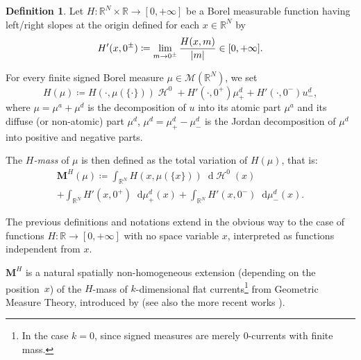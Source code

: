 \documentclass[10pt]{amsart}
\theoremstyle{plain}
\theoremstyle{definition}
\newtheorem{definition}[theorem]{Definition}
\newcommand{\dd}{\mathop{}\mathopen{}\mathrm{d}}
\newcommand{\R}{\mathbb{R}}
\newcommand{\Mspace}{\mathscr{M}}
\newcommand{\mass}{\boldsymbol{M}}
\DeclarePairedDelimiter{\abs}{\lvert}{\rvert}
\DeclareMathOperator{\hdm}{\mathcal{H}}
\begin{document}
\label{sectionHmass}

\begin{definition}\label{defHmass}
Let \(H:\R^N\times\R\to[0,+\infty]\) be a Borel measurable function having left/right slopes at the origin defined for each $x\in\R^N$ by
\begin{equation}
\label{slopeDefinition}
H'(x,0^\pm)\coloneqq\lim_{m\to 0^\pm}\frac{H(x,m)}{\abs{m}} \in [0,+\infty].
\end{equation}

For every finite signed Borel measure \(\mu\in \Mspace(\R^N)\), we set
\[
H(\mu)\coloneqq H(\cdot,\mu(\{\cdot\}))\hdm^0+H'(\cdot,0^+) \mu^d_++H'(\cdot,0^-) u^d_-,
\]
where \(\mu = \mu^a+\mu^d\) is the decomposition of $u$ into its atomic part $\mu^a$ and its diffuse (or non-atomic) part $\mu^d$, $\mu^d=\mu^d_+-\mu^d_-$ is the Jordan decomposition of $\mu^d$ into positive and negative parts.

The \emph{$H$-mass} of $\mu$ is then defined as the total variation of $H(\mu)$, that is:
\begin{multline*}
\mass^H(\mu)\coloneqq \int_{\R^N} H(x,\mu(\{x\})) \dd\hdm^0(x)\\
+ \int_{\R^N} H'(x,0^+) \dd \mu^d_+(x) + \int_{\R^N} H'(x,0^-) \dd \mu^d_-(x).
\end{multline*}
\end{definition}
The previous definitions and notations extend in the obvious way to the case of functions \(H:\R\to[0,+\infty]\) with no space variable \(x\), interpreted as functions independent from \(x\).

\(\mass^H\) is a natural spatially non-homogeneous extension (depending on the position~$x$) of the $H$-mass of $k$-dimensional flat currents\footnote{In the case $k=0$, since signed measures are merely $0$-currents with finite mass.} from Geometric Measure Theory, introduced by \cite{flemingFlatChainsFinite1966} (see also the more recent works \cite{depauwSizeMinimizationApproximating2003,colomboLowerSemicontinuousEnvelope2017}).
\end{document}

